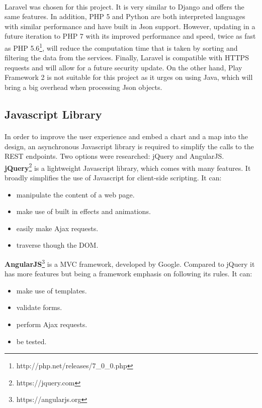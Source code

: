 \documentclass{l4proj}
\begin{document}
\paragraph{}
Laravel was chosen for this project. It is very similar to Django and offers the same features. In addition, PHP 5 and Python are both interpreted languages with similar performance and have built in Json support. However, updating in a future iteration to PHP 7 with its improved performance and speed, twice as fast as PHP 5.6\footnote{http://php.net/releases/7_0_0.php}, will reduce the computation time that is taken by sorting and filtering the data from the services. Finally, Laravel is compatible with HTTPS requests and will allow for a future security update. On the other hand, Play Framework 2 is not suitable for this project as it urges on using Java, which will bring a big overhead when processing Json objects. 


\subsection{Javascript Library}
\paragraph{}
In order to improve the user experience and embed a chart and a map into the design, an asynchronous Javascript library is required to simplify the calls to the REST endpoints. Two options were researched: jQuery and AngularJS.
\\\hspace*{7mm}\textbf{jQuery}\footnote{https://jquery.com} is a lightweight Javascript library, which comes with many features. It broadly simplifies the use of Javascript for client-side scripting. It can:
\begin{multicols}{2}
	\begin{itemize}
		\item manipulate the content of a web page.
		\item make use of built in effects and animations.
		\item easily make Ajax requests.
		\item traverse though the DOM.
	\end{itemize} 
\end{multicols}
\textbf{AngularJS}\footnote{https://angularjs.org} is a MVC framework, developed by Google. Compared to jQuery it has more features but being a framework emphasis on following its rules. It can:
\begin{multicols}{2}
	\begin{itemize}
		\item make use of templates.
		\item validate forms.
		\item perform Ajax requests.
		\item be tested.
	\end{itemize} 
\end{multicols}
\end{document}
